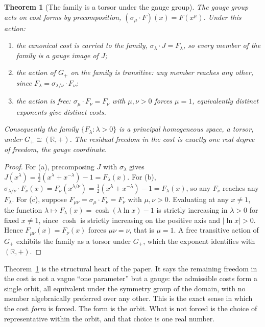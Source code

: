\documentclass[11pt,a4paper]{article}
\newtheorem{theorem}{Theorem}[section]
\theoremstyle{definition}
\theoremstyle{remark}
\newcommand{\costL}[1]{F_{#1}}
\begin{document}
\begin{theorem}[The family is a torsor under the gauge group]\label{thm:torsor}
The gauge group acts on cost forms by precomposition,
$(\sigma_{\mu} \cdot F)(x) = F(x^{\mu})$. Under this action:
\begin{enumerate}[leftmargin=2em, label=\textup{(\alph*)}]
  \item the canonical cost is carried to the family, $\sigma_{\lambda} \cdot J = \costL{\lambda}$,
    so every member of the family is a gauge image of $J$;
  \item the action of $G_{+}$ on the family is transitive: any member reaches any
    other, since $\costL{\lambda} = \sigma_{\lambda/\nu} \cdot \costL{\nu}$;
  \item the action is free: $\sigma_{\mu} \cdot \costL{\nu} = \costL{\nu}$ with
    $\mu, \nu > 0$ forces $\mu = 1$, equivalently distinct exponents give distinct
    costs.
\end{enumerate}
Consequently the family $\{\costL{\lambda} : \lambda > 0\}$ is a principal
homogeneous space, a torsor, under $G_{+} \cong (\mathbb{R}, +)$. The residual
freedom in the cost is exactly one real degree of freedom, the gauge coordinate.
\end{theorem}

\begin{proof}
For (a), precomposing $J$ with $\sigma_{\lambda}$ gives
$J(x^{\lambda}) = \tfrac{1}{2}(x^{\lambda} + x^{-\lambda}) - 1 = \costL{\lambda}(x)$.
For (b), $\sigma_{\lambda/\nu} \cdot \costL{\nu}(x) = \costL{\nu}(x^{\lambda/\nu})
= \tfrac{1}{2}(x^{\lambda} + x^{-\lambda}) - 1 = \costL{\lambda}(x)$, so any
$\costL{\nu}$ reaches any $\costL{\lambda}$. For (c), suppose
$\costL{\mu\nu} = \sigma_{\mu} \cdot \costL{\nu} = \costL{\nu}$ with $\mu, \nu > 0$.
Evaluating at any $x \neq 1$, the function $\lambda \mapsto \costL{\lambda}(x)
= \cosh(\lambda \ln x) - 1$ is strictly increasing in $\lambda > 0$ for fixed
$x \neq 1$, since $\cosh$ is strictly increasing on the positive axis and
$|\ln x| > 0$. Hence $\costL{\mu\nu}(x) = \costL{\nu}(x)$ forces $\mu\nu = \nu$,
that is $\mu = 1$. A free transitive action of $G_{+}$ exhibits the family as a
torsor under $G_{+}$, which the exponent identifies with $(\mathbb{R}, +)$.
\end{proof}

Theorem~\ref{thm:torsor} is the structural heart of the paper. It says the
remaining freedom in the cost is not a vague ``one parameter'' but a gauge: the
admissible costs form a single orbit, all equivalent under the symmetry group of
the domain, with no member algebraically preferred over any other. This is the
exact sense in which the cost \emph{form} is forced. The form is the orbit. What
is not forced is the choice of representative within the orbit, and that choice is
one real number.
\end{document}
